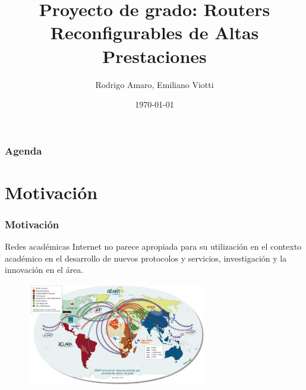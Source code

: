 \documentclass{beamer}
\title[RRAP]{Proyecto de grado: Routers Reconfigurables de Altas Prestaciones} %
\author{Rodrigo Amaro, Emiliano Viotti}
\institute[UdelaR] %
{
Instituto de Computaci\'on \\ Facultad de Ingeniería \\ Universidad de la República \\ \vspace{0.2cm} Tutores: Dr. Eduardo Gramp\'in, MSc. Mart\'in Giachino %
}
\date{\today} %
\begin{document}
\begin{frame}
\titlepage %
\end{frame}


\begin{frame}
\frametitle{Agenda} %
\tableofcontents %
\end{frame}



\section{Motivaci\'on} 

\begin{frame}
\frametitle{Motivaci\'on} 

\begin{block}{Redes acad\'emicas}
Internet no parece apropiada para su utilizaci\'on en el contexto académico en el desarrollo de nuevos protocolos y servicios, investigaci\'on y la innovaci\'on en el \'area.
\end{block}

\begin{figure}[h] 
\centering    
\includegraphics[width=0.7\textwidth]{imagenes/redesAcademicas.png}
\label{fig:AcademicNetworks}
\end{figure}

\end{frame}
\end{document}
